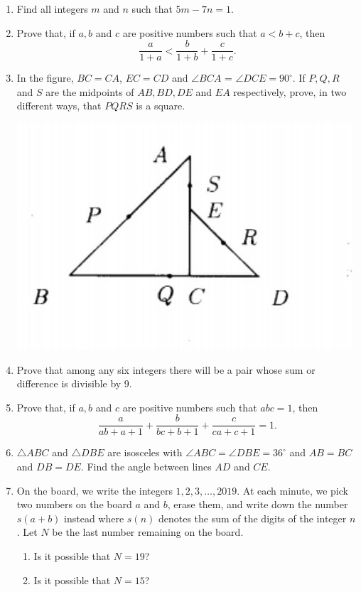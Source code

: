 \documentclass{article}
\begin{document}
\begin{enumerate}[1.]

\bigskip
\item %
Find all integers $m$ and $n$ such that $5m- 7n = 1$.


\bigskip
\item %
Prove that, if $a, b$ and $c$ are positive numbers such that $a < b + c$, then
\[ \frac{a}{1+a} < \frac{b}{1+b} + \frac{c}{1+c}. \]


\bigskip
\item
In the figure, $BC = CA$, $EC = CD$ and $\angle BCA$ = $\angle DCE = 90^{\circ}$.
If $P, Q, R$ and $S$ are the midpoints of $AB, BD, DE$ and $EA$ respectively, prove, in two different ways, that $PQRS$ is a square.
\begin{center}
	\includegraphics[scale=0.5]{int_q5.jpg}
\end{center}


\item %
Prove that among any six integers there will be a pair whose sum
or difference is divisible by 9.


\bigskip
\item %
Prove that, if $a, b$ and $c$ are positive numbers such that $abc= 1$, then
\[ \frac{a}{ab + a + 1} + \frac{b}{bc + b + 1} + \frac{c}{ca + c + 1} = 1. \]


\bigskip
\item 
$\triangle ABC$ and $\triangle DBE$ are isosceles with $\angle ABC = \angle DBE = 36^{\circ}$ and $AB = BC$ and $DB = DE$.
Find the angle between lines $AD$ and $CE$.


\bigskip
\item  %
On the board, we write the integers $1, 2, 3, \dots, 2019$.
At each minute, we pick two numbers on the board $a$ and $b$, erase them, and write down the number $s(a + b)$ instead where $s(n)$ denotes the sum of the digits of the integer $n$.
Let $N$ be the last number remaining on the board.
\begin{enumerate}
	\item Is it possible that $N = 19$?
	\item Is it possible that $N = 15$?
\end{enumerate}



\end{enumerate}
\end{document}
